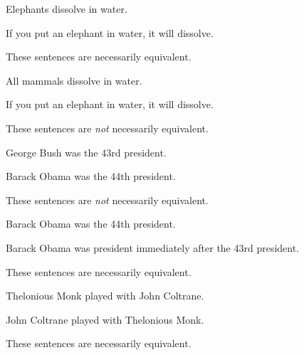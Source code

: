\begin{earg}
\item Elephants dissolve in water.
\item[]	If you put an elephant in water, it will dissolve.
\item[]These sentences are necessarily equivalent.\smallskip

\item All mammals dissolve in water.
\item[]	If you put an elephant in water, it will dissolve.
\item[] These sentences are \textit{not} necessarily equivalent.\smallskip 

\item George Bush was the 43rd president. 
\item[]	Barack Obama was the 44th president.
\item[] These sentences are \textit{not} necessarily equivalent.\smallskip
 
\item Barack Obama was the 44th president.
\item[]	Barack Obama was president immediately after the 43rd president.
\item[] These sentences are necessarily equivalent.\smallskip 



\item  Thelonious Monk played with John Coltrane.
	\item[]	John Coltrane played with Thelonious Monk.
	\item[] These sentences are necessarily equivalent.\smallskip
	
\end{earg}

